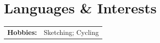 \section{\textbf{Languages \& Interests}}
\vspace{-0.4mm}
{\small
\begin{tabular*}{\textwidth}{@{}p{2.4cm}p{13cm}@{}}
	\textbf{Hobbies:} & Sketching; Cycling\\
\end{tabular*}
}\vspace{-6mm}